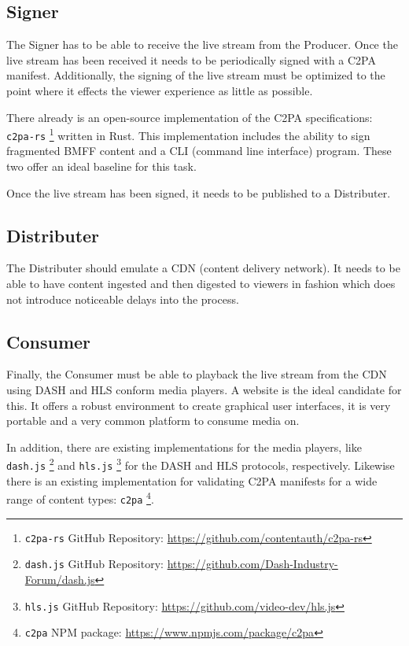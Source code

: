 \subsection{Signer}

The Signer has to be able to receive the live stream from the Producer. Once the live stream has been received it needs to be periodically signed with a C2PA manifest. Additionally, the signing of the live stream must be optimized to the point where it effects the viewer experience as little as possible.

There already is an open-source implementation of the C2PA specifications: \texttt{c2pa-rs} \footnote{\texttt{c2pa-rs} GitHub Repository: \url{https://github.com/contentauth/c2pa-rs}} written in Rust. This implementation includes the ability to sign fragmented BMFF content and a CLI (command line interface) program. These two offer an ideal baseline for this task.

Once the live stream has been signed, it needs to be published to a Distributer.

\subsection{Distributer}

The Distributer should emulate a CDN (content delivery network). It needs to be able to have content ingested and then digested to viewers in fashion which does not introduce noticeable delays into the process.

\subsection{Consumer}

Finally, the Consumer must be able to playback the live stream from the CDN using DASH and HLS conform media players. A website is the ideal candidate for this. It offers a robust environment to create graphical user interfaces, it is very portable and a very common platform to consume media on.

In addition, there are existing implementations for the media players, like \texttt{dash.js} \footnote{\texttt{dash.js} GitHub Repository: \url{https://github.com/Dash-Industry-Forum/dash.js}} and \texttt{hls.js} \footnote{\texttt{hls.js} GitHub Repository: \url{https://github.com/video-dev/hls.js}} for the DASH and HLS protocols, respectively. Likewise there is an existing implementation for validating C2PA manifests for a wide range of content types: \texttt{c2pa} \footnote{\texttt{c2pa} NPM package: \url{https://www.npmjs.com/package/c2pa}}.